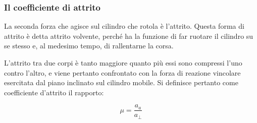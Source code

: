 \subsubsection*{Il coefficiente di attrito}

La seconda forza che agisce sul cilindro che rotola è l'attrito. Questa forma di attrito è detta attrito volvente, perché ha la funzione di far ruotare il cilindro su se stesso e, al medesimo tempo, di rallentarne la corsa.\newline

L'attrito tra due corpi è tanto maggiore quanto più essi sono compressi l'uno contro l'altro, e viene pertanto confrontato con la forza di reazione vincolare esercitata dal piano inclinato sul cilindro mobile. Si definisce pertanto come coefficiente d'attrito il rapporto:

\begin{center}
\begin{equation}
\mu = \frac {a_a}{a_{\perp}}
\end{equation}
\end{center}
